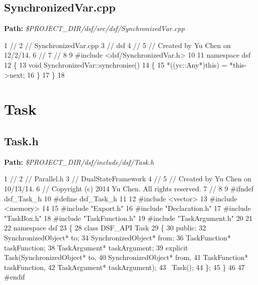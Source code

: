  \hypertarget{_dual_state_framework_DualStateFrameworkSynchronizedVar_cpp}{}\subsection{Synchronized\+Var.\+cpp}\label{_dual_state_framework_DualStateFrameworkSynchronizedVar_cpp}
{\bfseries Path\+:} {\itshape \$\+P\+R\+O\+J\+E\+C\+T\+\_\+\+D\+I\+R/dsf/src/dsf/\+Synchronized\+Var.cpp} 
\begin{DoxyCodeInclude}
1 \textcolor{comment}{//}
2 \textcolor{comment}{//  SynchronizedVar.cpp}
3 \textcolor{comment}{//  dsf}
4 \textcolor{comment}{//}
5 \textcolor{comment}{//  Created by Yu Chen on 12/2/14.}
6 \textcolor{comment}{//}
7 \textcolor{comment}{//}
8 
9 \textcolor{preprocessor}{#include <dsf/SynchronizedVar.h>}
10 
11 \textcolor{keyword}{namespace }dsf
12 \{
13     \textcolor{keywordtype}{void} SynchronizedVar::synchronise()
14     \{
15         *((yc::Any*)\textcolor{keyword}{this}) = *this->next;
16     \}
17 \}
18 
\end{DoxyCodeInclude}
 \hypertarget{_dual_state_framework_DualStateFrameworkTask}{}\section{Task}\label{_dual_state_framework_DualStateFrameworkTask}
\hypertarget{_dual_state_framework_DualStateFrameworkTask_h}{}\subsection{Task.\+h}\label{_dual_state_framework_DualStateFrameworkTask_h}
{\bfseries Path\+:} {\itshape \$\+P\+R\+O\+J\+E\+C\+T\+\_\+\+D\+I\+R/dsf/include/dsf/\+Task.h} 
\begin{DoxyCodeInclude}
1 \textcolor{comment}{//}
2 \textcolor{comment}{//  Parallel.h}
3 \textcolor{comment}{//  DualStateFramework}
4 \textcolor{comment}{//}
5 \textcolor{comment}{//  Created by Yu Chen on 10/13/14.}
6 \textcolor{comment}{//  Copyright (c) 2014 Yu Chen. All rights reserved.}
7 \textcolor{comment}{//}
8 
9 \textcolor{preprocessor}{#ifndef dsf\_Task\_h}
10 \textcolor{preprocessor}{#define dsf\_Task\_h}
11 
12 \textcolor{preprocessor}{#include <vector>}
13 \textcolor{preprocessor}{#include <memory>}
14 
15 \textcolor{preprocessor}{#include "Export.h"}
16 \textcolor{preprocessor}{#include "Declaration.h"}
17 \textcolor{preprocessor}{#include "TaskBox.h"}
18 \textcolor{preprocessor}{#include "TaskFunction.h"}
19 \textcolor{preprocessor}{#include "TaskArgument.h"}
20 
21 
22 \textcolor{keyword}{namespace }dsf
23 \{
28     \textcolor{keyword}{class }DSF\_API Task
29     \{
30     \textcolor{keyword}{public}:
32         SynchronizedObject* to;
34         SynchronizedObject* from;
36         TaskFunction* taskFunction;
38         TaskArgument* taskArgument;
39         \textcolor{keyword}{explicit} Task(SynchronizedObject* to,
40              SynchronizedObject* from,
41              TaskFunction* taskFunction,
42              TaskArgument* taskArgument);
43         ~Task();
44     \};
45 \}
46 
47 \textcolor{preprocessor}{#endif}
\end{DoxyCodeInclude}
